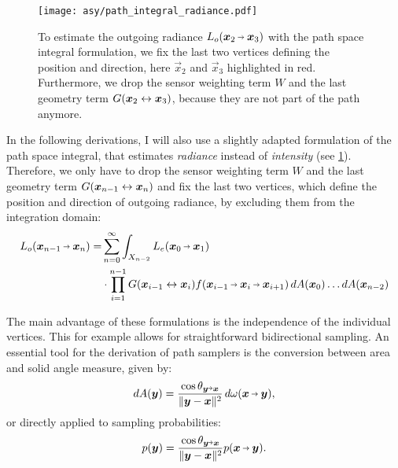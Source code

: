 \begin{figure}[ht]
    \centering
    \texttt{[image: asy/path\_integral\_radiance.pdf]}
\caption{To estimate the outgoing radiance $L_o(\pdir{2}{3})$ with the path space integral formulation, we fix the last two vertices defining the position and direction, here $\vec{x}_2$ and $\vec{x}_3$ highlighted in red. Furthermore, we drop the sensor weighting term $W$ and the last geometry term $G(\bm{x}_{2} \leftrightarrow \bm{x}_{3})$, because they are not part of the path anymore.}
\label{fig:path_space_integral_radiance}
\end{figure}
In the following derivations, I will also use a slightly adapted formulation of the path space integral, that estimates \emph{radiance} instead of \emph{intensity} (see \cref{fig:path_space_integral_radiance}).
Therefore, we only have to drop the sensor weighting term $W$ and the last geometry term $G(\bm{x}_{n-1} \leftrightarrow \bm{x}_{n})$ and fix the last two vertices, which define the position and direction of outgoing radiance, by excluding them from the integration domain:
\begin{equation}
\label{eq:path_space_integral_radiance}
\begin{aligned}
    L_o(\pdir{n-1}{n})
    = &\sum_{n=0}^{\infty} \int_{X_{n-2}} L_e(\pdir{0}{1}) \\
    &\cdot \prod_{i=1}^{n - 1} \G{i-1}{i} \f{i-1}{i}{i+1} 
    \diff A(\vec{x}_0) \dots \diff A(\vec{x}_{n-2})
\end{aligned}
\end{equation}

The main advantage of these formulations is the independence of the individual vertices.
This for example allows for straightforward bidirectional sampling.
An essential tool for the derivation of path samplers is the conversion between area and solid angle measure, given by:
\begin{equation}
\label{eq:area_solid_angle}
\diff A(\vec{y}) = \frac{\cos \theta_{\vec{y}\veryshortarrow\vec{x}}}{\|\vec{y} - \vec{x}\|^2} \diff \omega(\vec{x}\pto\vec{y}),
\end{equation}
or directly applied to sampling probabilities:
\begin{equation}
\label{eq:area_solid_angle_p}
p(\vec{y}) = \frac{\cos \theta_{\vec{y}\veryshortarrow\vec{x}}}{\|\vec{y} - \vec{x}\|^2} p(\vec{x}\pto\vec{y}).
\end{equation}

